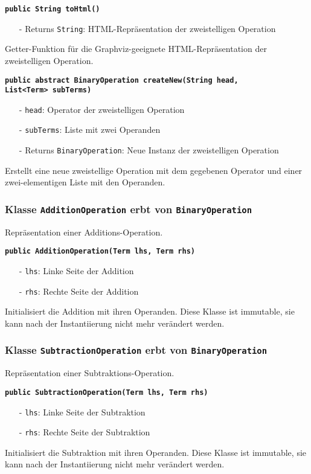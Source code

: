 \documentclass[parskip=full,11pt,twoside]{scrartcl}
\begin{document}
\textbf{\texttt{public String toHtml()}}
\begin{itemize}[noitemsep]
	\item[-] Returns \texttt{String}: HTML-Repräsentation der zweistelligen Operation
\end{itemize}
Getter-Funktion für die Graphviz-geeignete HTML-Repräsentation der zweistelligen Operation.

\textbf{\texttt{public abstract BinaryOperation createNew(String head,\\List<Term> subTerms)}}
\begin{itemize}[noitemsep]
	\item[-] \texttt{head}: Operator der zweistelligen Operation
	\item[-] \texttt{subTerms}: Liste mit zwei Operanden
	\item[-] Returns \texttt{BinaryOperation}: Neue Instanz der zweistelligen Operation
\end{itemize}
Erstellt eine neue zweistellige Operation mit dem gegebenen Operator und einer zwei-elementigen Liste mit den Operanden.

\subsubsection{Klasse \texttt{AdditionOperation} erbt von \texttt{BinaryOperation}}
Repräsentation einer Additions-Operation.

\textbf{\texttt{public AdditionOperation(Term lhs, Term rhs)}}
\begin{itemize}[noitemsep]
	\item[-] \texttt{lhs}: Linke Seite der Addition
	\item[-] \texttt{rhs}: Rechte Seite der Addition
\end{itemize}
Initialisiert die Addition mit ihren Operanden. Diese Klasse ist immutable, sie kann nach der Instantiierung nicht mehr verändert werden.

\subsubsection{Klasse \texttt{SubtractionOperation} erbt von \texttt{BinaryOperation}}
Repräsentation einer Subtraktions-Operation.

\textbf{\texttt{public SubtractionOperation(Term lhs, Term rhs)}}
\begin{itemize}[noitemsep]
	\item[-] \texttt{lhs}: Linke Seite der Subtraktion
	\item[-] \texttt{rhs}: Rechte Seite der Subtraktion
\end{itemize}
Initialisiert die Subtraktion mit ihren Operanden. Diese Klasse ist immutable, sie kann nach der Instantiierung nicht mehr verändert werden.
\end{document}

